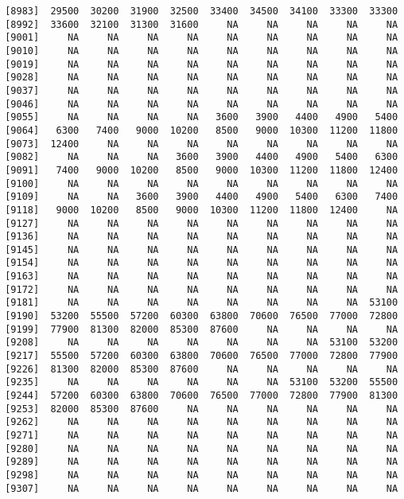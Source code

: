 \documentclass[]{article}
\begin{document}
\begin{verbatim}
 [8983]  29500  30200  31900  32500  33400  34500  34100  33300  33300
 [8992]  33600  32100  31300  31600     NA     NA     NA     NA     NA
 [9001]     NA     NA     NA     NA     NA     NA     NA     NA     NA
 [9010]     NA     NA     NA     NA     NA     NA     NA     NA     NA
 [9019]     NA     NA     NA     NA     NA     NA     NA     NA     NA
 [9028]     NA     NA     NA     NA     NA     NA     NA     NA     NA
 [9037]     NA     NA     NA     NA     NA     NA     NA     NA     NA
 [9046]     NA     NA     NA     NA     NA     NA     NA     NA     NA
 [9055]     NA     NA     NA     NA   3600   3900   4400   4900   5400
 [9064]   6300   7400   9000  10200   8500   9000  10300  11200  11800
 [9073]  12400     NA     NA     NA     NA     NA     NA     NA     NA
 [9082]     NA     NA     NA   3600   3900   4400   4900   5400   6300
 [9091]   7400   9000  10200   8500   9000  10300  11200  11800  12400
 [9100]     NA     NA     NA     NA     NA     NA     NA     NA     NA
 [9109]     NA     NA   3600   3900   4400   4900   5400   6300   7400
 [9118]   9000  10200   8500   9000  10300  11200  11800  12400     NA
 [9127]     NA     NA     NA     NA     NA     NA     NA     NA     NA
 [9136]     NA     NA     NA     NA     NA     NA     NA     NA     NA
 [9145]     NA     NA     NA     NA     NA     NA     NA     NA     NA
 [9154]     NA     NA     NA     NA     NA     NA     NA     NA     NA
 [9163]     NA     NA     NA     NA     NA     NA     NA     NA     NA
 [9172]     NA     NA     NA     NA     NA     NA     NA     NA     NA
 [9181]     NA     NA     NA     NA     NA     NA     NA     NA  53100
 [9190]  53200  55500  57200  60300  63800  70600  76500  77000  72800
 [9199]  77900  81300  82000  85300  87600     NA     NA     NA     NA
 [9208]     NA     NA     NA     NA     NA     NA     NA  53100  53200
 [9217]  55500  57200  60300  63800  70600  76500  77000  72800  77900
 [9226]  81300  82000  85300  87600     NA     NA     NA     NA     NA
 [9235]     NA     NA     NA     NA     NA     NA  53100  53200  55500
 [9244]  57200  60300  63800  70600  76500  77000  72800  77900  81300
 [9253]  82000  85300  87600     NA     NA     NA     NA     NA     NA
 [9262]     NA     NA     NA     NA     NA     NA     NA     NA     NA
 [9271]     NA     NA     NA     NA     NA     NA     NA     NA     NA
 [9280]     NA     NA     NA     NA     NA     NA     NA     NA     NA
 [9289]     NA     NA     NA     NA     NA     NA     NA     NA     NA
 [9298]     NA     NA     NA     NA     NA     NA     NA     NA     NA
 [9307]     NA     NA     NA     NA     NA     NA     NA     NA     NA

\end{verbatim}
\end{document}
